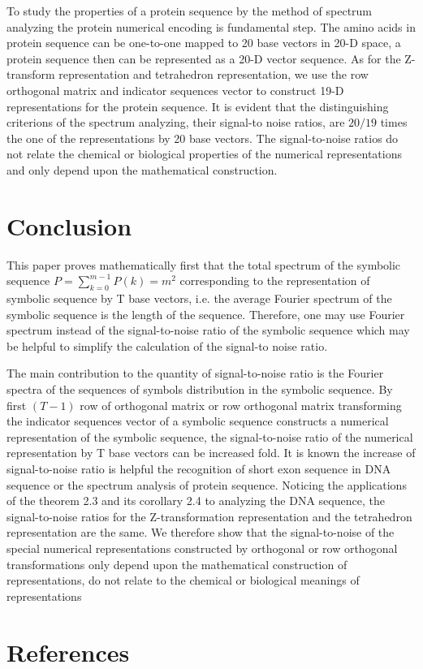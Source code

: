 \documentclass[preprint,authoryear,12pt]{elsarticle}
\begin{document}
To study the properties of a protein sequence by the method of spectrum analyzing the protein numerical encoding is fundamental step. The amino acids in protein sequence can be one-to-one mapped to 20 base vectors in 20-D space, a protein sequence then can be represented as a 20-D vector sequence. As for the Z-transform representation and tetrahedron representation, we use the row orthogonal matrix and indicator sequences vector to construct 19-D representations for the protein sequence. It is evident that the distinguishing criterions of the spectrum analyzing, their signal-to noise ratios, are $20/19$ times the one of the representations by 20 base vectors. The signal-to-noise ratios do not relate the chemical or biological properties of the numerical representations and only depend upon the mathematical construction.

\section{Conclusion}
This paper proves  mathematically first that the total spectrum of the symbolic sequence $P = \sum\limits_{k = 0}^{m - 1} {P(k)}  = m^2$  corresponding to the representation of symbolic sequence by T base vectors, i.e. the average Fourier spectrum of the symbolic sequence is the length of the sequence. Therefore, one may use Fourier spectrum instead of the signal-to-noise ratio of the symbolic sequence which may be helpful to simplify the calculation of the signal-to noise ratio.

The main contribution to the quantity of signal-to-noise ratio is the Fourier spectra of the sequences of symbols distribution in the symbolic sequence. By first $(T - 1)$ row of orthogonal matrix or row orthogonal matrix transforming the indicator sequences vector of a symbolic sequence constructs a numerical representation of the symbolic sequence, the signal-to-noise ratio of the numerical representation by T base vectors can be increased fold. It is known the increase of signal-to-noise ratio is helpful the recognition of short exon sequence in DNA sequence or the spectrum analysis of protein sequence. Noticing the applications of the theorem 2.3 and its corollary 2.4 to analyzing the DNA sequence, the signal-to-noise ratios for the Z-transformation representation and the tetrahedron representation are the same. We therefore show that the signal-to-noise of the special numerical representations constructed by orthogonal or row orthogonal transformations only depend upon the mathematical construction of representations, do not relate to the chemical or biological meanings of representations
\small

























\section*{References}






\end{document}
